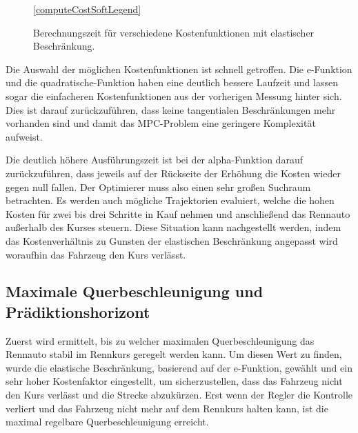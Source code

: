 \documentclass{like}
\begin{document}
\begin{figure}
	\centering
	 
	\ref{computeCostSoftLegend}
	\caption{Berechnungszeit für verschiedene Kostenfunktionen mit elastischer Beschränkung.}
	\label{fig:computeCostSoftConst}
\end{figure}

Die Auswahl der möglichen Kostenfunktionen ist schnell getroffen. Die e-Funktion und die quadratische-Funktion haben eine deutlich bessere Laufzeit und lassen sogar die einfacheren Kostenfunktionen aus der vorherigen Messung hinter sich. Dies ist darauf zurückzuführen, dass keine tangentialen Beschränkungen mehr vorhanden sind und damit das \ac{MPC}-Problem eine geringere Komplexität aufweist.

Die deutlich höhere Ausführungszeit ist bei der alpha-Funktion darauf zurückzuführen, dass jeweils auf der Rückseite der Erhöhung die Kosten wieder gegen null fallen. Der Optimierer muss also einen sehr großen Suchraum betrachten. Es werden auch mögliche Trajektorien evaluiert, welche die hohen Kosten für zwei bis drei Schritte in Kauf nehmen und anschließend das Rennauto außerhalb des Kurses steuern. Diese Situation kann nachgestellt werden, indem das Kostenverhältnis zu Gunsten der elastischen Beschränkung angepasst wird woraufhin das Fahrzeug den Kurs verlässt.  


\subsection{Maximale Querbeschleunigung und Prädiktionshorizont}
Zuerst wird ermittelt, bis zu welcher maximalen Querbeschleunigung das Rennauto stabil im Rennkurs geregelt werden kann. Um diesen Wert zu finden, wurde die elastische Beschränkung, basierend auf der e-Funktion, gewählt und ein sehr hoher Kostenfaktor eingestellt, um sicherzustellen, dass das Fahrzeug nicht den Kurs verlässt und die Strecke abzukürzen. Erst wenn der Regler die Kontrolle verliert und das Fahrzeug nicht mehr auf dem Rennkurs halten kann, ist die maximal regelbare Querbeschleunigung erreicht.
\end{document}
